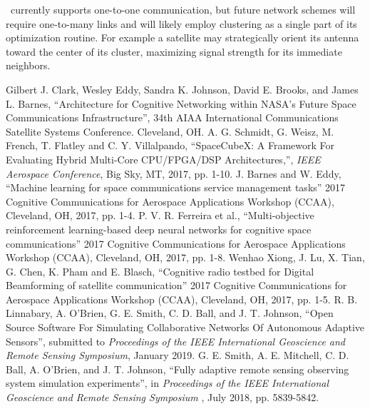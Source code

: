 \documentclass[conference]{IEEEtran}
\newcommand{\project}{{\sc{Collaborate}}~}
\begin{document}
\vfill
\break

\project currently supports one-to-one communication, but future network schemes
will require one-to-many links and will likely employ clustering as a single
part of its optimization routine.  For example a satellite may strategically
orient its antenna toward the center of its cluster, maximizing signal strength
for its immediate neighbors.


\small
\begin{thebibliography}{9}
 {
    Gilbert J. Clark, Wesley Eddy, Sandra K. Johnson, David E. Brooks, and
    James L. Barnes, ``Architecture for Cognitive Networking within NASA’s
    Future Space Communications Infrastructure'', 34th AIAA International
    Communications Satellite Systems Conference. Cleveland, OH.}
 {
    A. G. Schmidt, G. Weisz, M. French, T. Flatley and C. Y. Villalpando,
    ``SpaceCubeX: A Framework For Evaluating Hybrid Multi-Core CPU/FPGA/DSP
    Architectures,'', \textit{IEEE Aerospace Conference}, Big Sky, MT, 2017,
    pp. 1-10.}
 {
    J. Barnes and W. Eddy, ``Machine learning for space communications service
    management tasks'' 2017 Cognitive Communications for Aerospace Applications
    Workshop (CCAA), Cleveland, OH, 2017, pp. 1-4.
  }
 {
    P. V. R. Ferreira et al.,
    ``Multi-objective reinforcement learning-based deep neural networks for
    cognitive space communications''
    2017 Cognitive Communications for Aerospace Applications Workshop (CCAA),
    Cleveland, OH, 2017, pp. 1-8.
  }
 {
    Wenhao Xiong, J. Lu, X. Tian, G. Chen, K. Pham and E. Blasch, ``Cognitive
    radio testbed for Digital Beamforming of satellite communication'' 2017
    Cognitive Communications for Aerospace Applications Workshop (CCAA),
    Cleveland, OH, 2017, pp. 1-5.
}
 {
    R. B. Linnabary, A. O'Brien, G. E. Smith, C. D. Ball, and J. T. Johnson,
    ``Open Source Software For Simulating Collaborative Networks Of Autonomous
    Adaptive Sensors'', submitted to {\it Proceedings of the IEEE International
      Geoscience and Remote Sensing Symposium}, January 2019.}
 {
    G. E. Smith, A. E. Mitchell, C. D. Ball, A. O'Brien, and J. T. Johnson,
    ``Fully adaptive remote sensing observing system simulation experiments'',
    in {
      \it Proceedings of the IEEE International Geoscience and Remote Sensing
      Symposium} , July 2018, pp. 5839-5842.}
\end{thebibliography}
\end{document}
